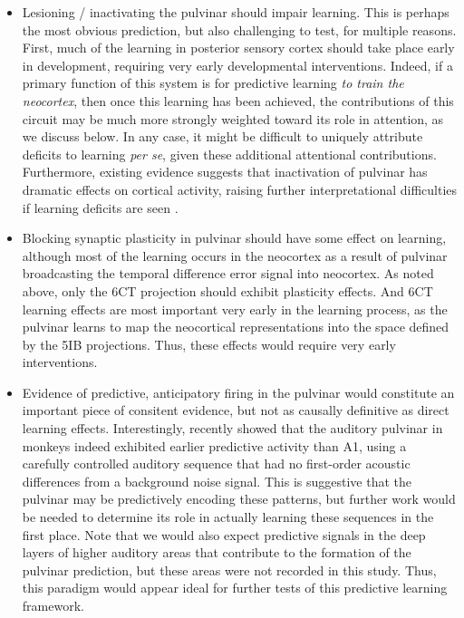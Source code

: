 \documentclass[11pt,twoside]{article}
\newif\myifpdf
\begin{document}
\begin{itemize}
	\item Lesioning / inactivating the pulvinar should impair learning.  This is perhaps the most obvious prediction, but also challenging to test, for multiple reasons.  First, much of the learning in posterior sensory cortex should take place early in development, requiring very early developmental interventions.  Indeed, if a primary function of this system is for predictive learning \emph{to train the neocortex}, then once this learning has been achieved, the contributions of this circuit may be much more strongly weighted toward its role in attention, as we discuss below.  In any case, it might be difficult to uniquely attribute deficits to learning \emph{per se}, given these additional attentional contributions.  Furthermore, existing evidence suggests that inactivation of pulvinar has dramatic effects on cortical activity, raising further interpretational difficulties if learning deficits are seen \cite{ZhouSchaferDesimone16,PurushothamanMarionLiEtAl12}.
	\item Blocking synaptic plasticity in pulvinar should have some effect on learning, although most of the learning occurs in the neocortex as a result of pulvinar broadcasting the temporal difference error signal into neocortex.  As noted above, only the 6CT projection should exhibit plasticity effects.  And 6CT learning effects are most important very early in the learning process, as the pulvinar learns to map the neocortical representations into the space defined by the 5IB projections.  Thus, these effects would require very early interventions.
	\item Evidence of predictive, anticipatory firing in the pulvinar would constitute an important piece of consitent evidence, but not as causally definitive as direct learning effects.  Interestingly,  recently showed that the auditory pulvinar in monkeys indeed exhibited earlier predictive activity than A1, using a carefully controlled auditory sequence that had no first-order acoustic differences from a background noise signal.  This is suggestive that the pulvinar may be predictively encoding these patterns, but further work would be needed to determine its role in actually learning these sequences in the first place.  Note that we would also expect predictive signals in the deep layers of higher auditory areas that contribute to the formation of the pulvinar prediction, but these areas were not recorded in this study.  Thus, this paradigm would appear ideal for further tests of this predictive learning framework.

\end{itemize}
\end{document}
